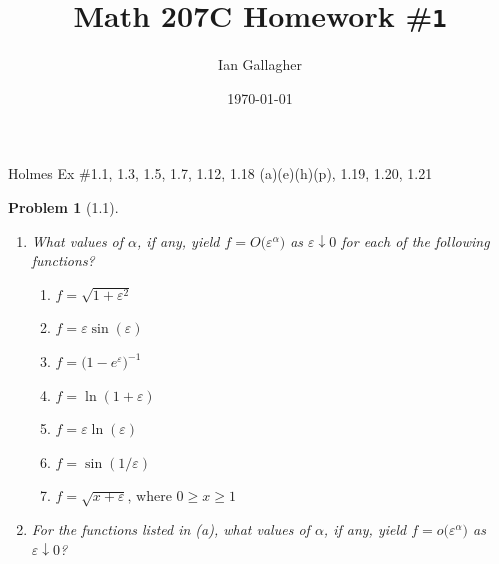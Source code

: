 \documentclass[11pt]{article}
\title{Math 207C Homework \#\texttt{1}}
\author{Ian Gallagher}
\date{\today}
\newcommand{\vep}{\varepsilon}
\theoremstyle{problemstyle}
\newtheorem{problem}{Problem}
\begin{document}
\maketitle

\noindent Holmes Ex \#1.1, 1.3, 1.5, 1.7, 1.12, 1.18 (a)(e)(h)(p), 1.19, 1.20, 1.21

\begin{problem}[1.1]
\mbox{} %
\begin{enumerate}
  \item What values of $\alpha$, if any, yield 
        \(
        f = O\bigl(\vep^\alpha\bigr)
        \)
        as $\vep \downarrow 0$ for each of the following functions?
  \begin{multicols}{2}
    \begin{enumerate}
      \item $f = \sqrt{1 + \vep^2}$ 
      \item $f = \vep \sin(\vep)$ 
      \item $f = \bigl(1 - e^\vep\bigr)^{-1}$
      \item $f = \ln(1 + \vep)$
      \item $f = \vep \ln(\vep)$
      \item $f = \sin(1 / \vep)$
      \item $f = \sqrt{x + \vep}\text{, where } 0 \geq x \geq 1$ \newline\mbox{}
    \end{enumerate}
  \end{multicols}
\item For the functions listed in (a), what values of $\alpha$, if any, yield
      \(
      f = o\bigl(\vep^\alpha\bigr)
      \)
      as $\vep \downarrow 0$?
\end{enumerate}
\end{problem}
\end{document}
